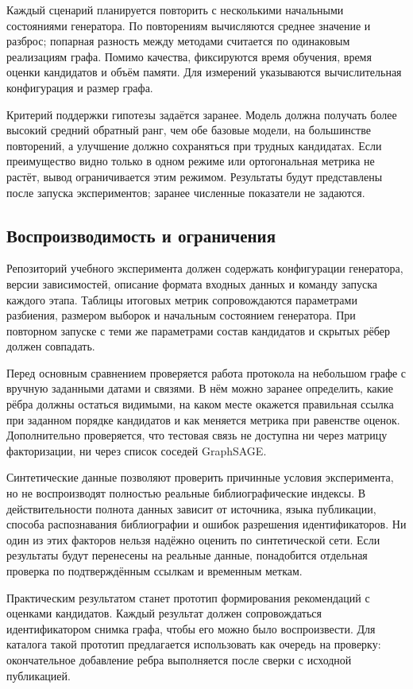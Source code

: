 \documentclass[a4paper,14pt,oneside]{extarticle}
\begin{document}
Каждый сценарий планируется повторить с несколькими начальными состояниями генератора.
По повторениям вычисляются среднее значение и разброс; попарная разность между методами
считается по одинаковым реализациям графа. Помимо качества, фиксируются время обучения,
время оценки кандидатов и объём памяти. Для измерений указываются вычислительная конфигурация
и размер графа.

Критерий поддержки гипотезы задаётся заранее. Модель должна получать более высокий средний
обратный ранг, чем обе базовые модели, на большинстве повторений, а улучшение должно сохраняться
при трудных кандидатах. Если преимущество видно только в одном режиме или ортогональная метрика
не растёт, вывод ограничивается этим режимом. Результаты будут представлены после запуска
экспериментов; заранее численные показатели не задаются.

\clearpage
\subsection{Воспроизводимость и ограничения}

Репозиторий учебного эксперимента должен содержать конфигурации генератора, версии зависимостей,
описание формата входных данных и команду запуска каждого этапа. Таблицы итоговых метрик
сопровождаются параметрами разбиения, размером выборок и начальным состоянием генератора.
При повторном запуске с теми же параметрами состав кандидатов и скрытых рёбер должен совпадать.

Перед основным сравнением проверяется работа протокола на небольшом графе с вручную заданными
датами и связями. В нём можно заранее определить, какие рёбра должны остаться видимыми,
на каком месте окажется правильная ссылка при заданном порядке кандидатов и как меняется
метрика при равенстве оценок. Дополнительно проверяется, что тестовая связь не доступна
ни через матрицу факторизации, ни через список соседей GraphSAGE.

Синтетические данные позволяют проверить причинные условия эксперимента, но не воспроизводят
полностью реальные библиографические индексы. В действительности полнота данных зависит
от источника, языка публикации, способа распознавания библиографии и ошибок разрешения
идентификаторов. Ни один из этих факторов нельзя надёжно оценить по синтетической сети.
Если результаты будут перенесены на реальные данные, понадобится отдельная проверка по
подтверждённым ссылкам и временным меткам.

Практическим результатом станет прототип формирования рекомендаций с оценками кандидатов.
Каждый результат должен сопровождаться идентификатором снимка графа, чтобы его можно было
воспроизвести. Для каталога такой прототип предлагается использовать как очередь на проверку:
окончательное добавление ребра выполняется после сверки с исходной публикацией.
\end{document}
